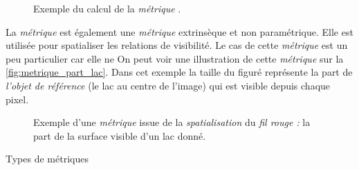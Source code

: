 \begin{figure}
  \centering
  
  \caption{Exemple du calcul de la \emph{métrique}
    \protect{}.}
  \label{fig:metrique_temps_marche}
\end{figure}


La \emph{métrique}  est également une
\emph{métrique} extrinsèque et non paramétrique. Elle est utilisée
pour spatialiser les relations de visibilité. Le cas de cette
\emph{métrique} est un peu particulier car elle ne 
%
On peut voir une illustration de cette \emph{métrique} sur la
\autoref{fig:metrique_part_lac}. Dans cet exemple la taille du figuré
représente la part de \emph{l'objet de référence} (le lac au centre de
l'image) qui est visible depuis chaque pixel.

\begin{figure}
  \centering
  
  \caption{Exemple d'une \emph{métrique} issue de la
    \emph{spatialisation} du \emph{fil rouge :} la part de la surface
    visible d'un lac donné.}
  \label{fig:metrique_part_lac}
\end{figure}

\begin{table}
  \centering
  
  \caption{Types de métriques}
  \label{fig:type_metriques}
\end{table}

